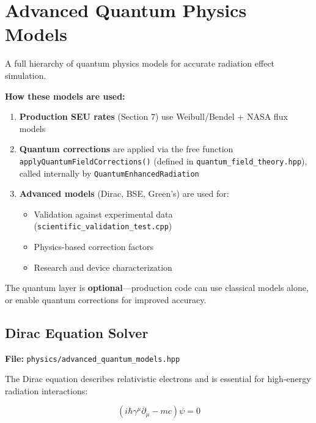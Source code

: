 \documentclass[11pt,a4paper]{article}
\begin{document}
\newpage
\section{Advanced Quantum Physics Models}

A full hierarchy of quantum physics models for accurate radiation effect simulation.

\begin{tcolorbox}[colback=yellow!5!white,colframe=yellow!75!black,title=Integration Clarification]
\textbf{How these models are used:}
\begin{enumerate}
    \item \textbf{Production SEU rates} (Section 7) use Weibull/Bendel + NASA flux models
    \item \textbf{Quantum corrections} are applied via the free function \texttt{applyQuantumFieldCorrections()} (defined in \texttt{quantum\_field\_theory.hpp}), called internally by \texttt{QuantumEnhancedRadiation}
    \item \textbf{Advanced models} (Dirac, BSE, Green's) are used for:
    \begin{itemize}
        \item Validation against experimental data (\texttt{scientific\_validation\_test.cpp})
        \item Physics-based correction factors
        \item Research and device characterization
    \end{itemize}
\end{enumerate}
The quantum layer is \textbf{optional}---production code can use classical models alone, or enable quantum corrections for improved accuracy.
\end{tcolorbox}

\subsection{Dirac Equation Solver}

\textbf{File:} \texttt{physics/advanced\_quantum\_models.hpp}

The Dirac equation describes relativistic electrons and is essential for high-energy radiation interactions:

\begin{equation}
(i\hbar\gamma^\mu\partial_\mu - mc)\psi = 0
\end{equation}
\end{document}
